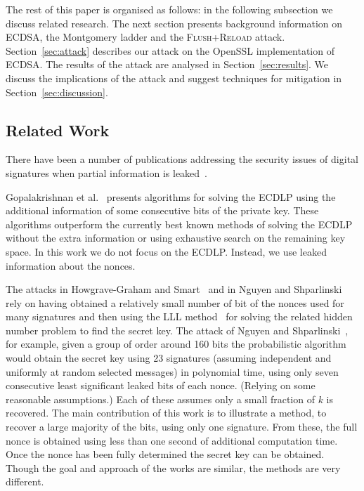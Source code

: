 \documentclass[twocolumn]{svjour3}
\newcommand{\fl}{\textsc{Flu\-sh+\allowbreak Re\-load}\xspace}
\newcommand{\myupcase}[1]{\uppercase{#1}}
\begin{document}
The rest of this paper is organised as follows: in the following subsection we discuss related research. The next section presents background information on \myupcase{ecdsa}, the Montgomery ladder and the \fl attack. %
Section~\ref{sec:attack} describes our attack on the OpenSSL implementation of \myupcase{ecdsa}.
The results of the attack are analysed in Section~\ref{sec:results}.
We discuss the implications of the attack and suggest techniques for mitigation in Section~\ref{sec:discussion}.

\subsection{Related Work}\label{sec:related}
There have been a number of publications addressing the security issues of digital signatures when partial information is leaked~\cite{Howgrave-GrahamS01,gopalakrishnan07solving,nguyen03insecurity}. 

Gopalakrishnan et al.~\cite{gopalakrishnan07solving} presents algorithms for solving the \myupcase{ecdlp} using the additional information of some consecutive bits of the private key. These algorithms outperform the currently best known methods of solving the \myupcase{ecdlp} without the extra information or using exhaustive search on the remaining key space. In this work we do not focus on the \myupcase{ecdlp}.
Instead, we use leaked information about the nonces. 

The attacks in Howgrave-Graham and Smart~\cite{Howgrave-GrahamS01} and in Nguyen and Shparlinski~\cite{nguyen03insecurity} 
rely on having obtained a relatively small number of bit of the nonces used for many signatures and then using the LLL method~\cite{LLL} for solving  
the related hidden number problem to find the secret key.
 The attack of Nguyen and Shparlinski~\cite{nguyen03insecurity}, for example, given a group of order around 160 bits the probabilistic algorithm would obtain the secret key using 23 signatures (assuming independent and uniformly at random selected messages) in polynomial time, using only seven consecutive least significant leaked bits of each nonce.
(Relying on some reasonable assumptions.) 
Each of these assumes only a small fraction of $k$ is recovered. The main contribution of this work is to illustrate a method, 
to recover a large majority of the bits, using only one signature.
From these, the full nonce is obtained using less than one second of additional computation time.
Once the nonce has been fully determined the secret key can be  obtained. 
Though the goal and approach of the works are similar, the methods are very different.
\end{document}
